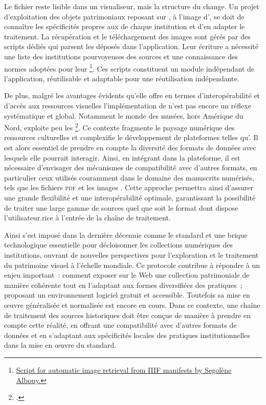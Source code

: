 Le fichier reste lisible dans un visualiseur, mais la structure du
\man change. Un projet d'exploitation des objets patrimoniaux
reposant sur \iiif, à l'image d'\eida, se doit de connaître les
spécificités propres aux \mans de chaque institution et d'en
adapter le traitement. La récupération et le téléchargement des images
sont gérés par des scripts dédiés qui parsent les \mans
déposés dans l'application. Leur écriture a nécessité une liste des
institutions pourvoyeuses des sources et une connaissance des normes
adoptées pour leur \mans\footnote{\href{https://github.com/Segolene-Albouy/iiif-downloader}{Script for automatic image retrieval from IIIF manifests by Segolène Albouy.}}.
Ces scripts constituent un module indépendant de l'application,
réutilisable et adaptable pour une réutilisation indépendante.

De plus, malgré les avantages évidents qu'elle offre en termes
d'interopérabilité et d'accès aux ressources visuelles l'implémentation
de \iiif n'est pas encore un réflexe systématique et global. Notamment le
monde des musées, hors Amérique du Nord, exploite peu les \api
\iiif\footcite{mallory_iiif_2019}.
Ce contexte fragmente le paysage numérique des ressources culturelles et
complexifie le développement de plateformes telles qu'\aikon. Il est
alors essentiel de prendre en compte la diversité des formats de données
avec lesquels elle pourrait interagir. Ainsi, en intégrant \iiif dans la
plateforme, il est nécessaire d'envisager des mécanismes de
compatibilité avec d'autres formats, en particulier ceux utilisés
couramment dans le domaine des manuscrits numérisés, tels que les
fichiers \textsc{pdf} et les images \jpeg. Cette approche permettra ainsi
d'assurer une grande flexibilité et une interopérabilité optimale,
garantissant la possibilité de traiter une large gamme de sources quel
que soit le format dont dispose l'utilisateur.rice à l'entrée de la chaîne de
traitement.

Ainsi \iiif s'est imposé dans la dernière décennie comme le standard et
une brique technologique essentielle pour décloisonner les collections
numériques des institutions, ouvrant de nouvelles perspectives pour
l'exploration et le traitement du patrimoine visuel à l'échelle
mondiale. Ce protocole contribue à répondre à un enjeu important~:
comment exposer sur le Web une collection patrimoniale de manière
cohérente tout en l'adaptant aux formes diversifiées des pratiques~;
proposant un environnement logiciel gratuit et accessible. Toutefois sa
mise en œuvre généralisée et normalisée est encore en cours. Dans ce
contexte, une chaîne de traitement des sources historiques doit être
conçue de manière à prendre en compte cette réalité, en offrant une
compatibilité avec d'autres formats de données et en s'adaptant aux
spécificités locales des pratiques institutionnelles dans la mise en
œuvre du standard.

